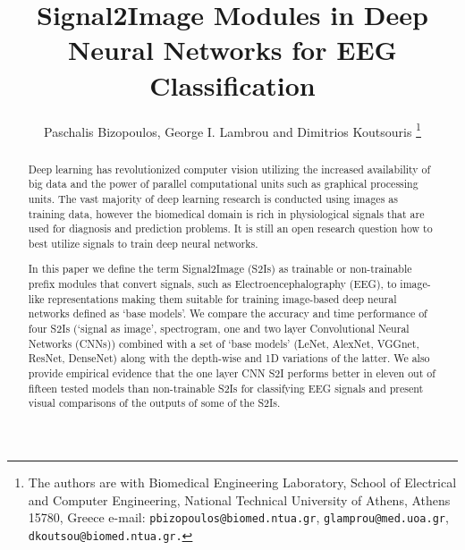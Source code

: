\documentclass[conference]{IEEEtran}
\begin{document}
\title{\LARGE \bf Signal2Image Modules in Deep Neural Networks for EEG Classification}
\author{Paschalis Bizopoulos, George I. Lambrou and Dimitrios Koutsouris%
\thanks{The authors are with Biomedical Engineering Laboratory, School of Electrical and Computer Engineering, National Technical University of Athens, Athens 15780, Greece e-mail: {\tt\small pbizopoulos@biomed.ntua.gr}, {\tt\small glamprou@med.uoa.gr}, {\tt\small dkoutsou@biomed.ntua.gr.}}
}

\maketitle

\begin{abstract}
	Deep learning has revolutionized computer vision utilizing the increased availability of big data and the power of parallel computational units such as graphical processing units.
	The vast majority of deep learning research is conducted using images as training data, however the biomedical domain is rich in physiological signals that are used for diagnosis and prediction problems.
	It is still an open research question how to best utilize signals to train deep neural networks.

	In this paper we define the term Signal2Image (S2Is) as trainable or non-trainable prefix modules that convert signals, such as Electroencephalography (EEG), to image-like representations making them suitable for training image-based deep neural networks defined as `base models'.
	We compare the accuracy and time performance of four S2Is (`signal as image', spectrogram, one and two layer Convolutional Neural Networks (CNNs)) combined with a set of `base models' (LeNet, AlexNet, VGGnet, ResNet, DenseNet) along with the depth-wise and 1D variations of the latter.
	We also provide empirical evidence that the one layer CNN S2I performs better in eleven out of fifteen tested models than non-trainable S2Is for classifying EEG signals and present visual comparisons of the outputs of some of the S2Is.
\end{abstract}
\end{document}
